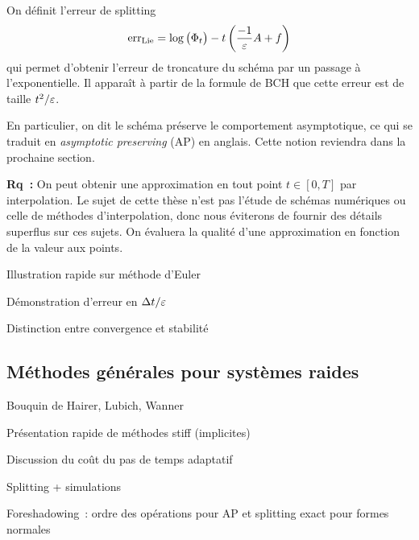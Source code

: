 On définit l'erreur de splitting 
\begin{equation*}
    \operatorname{err}_{\mathrm{Lie}} 
    = \log \big( \Phi_t \big) - t\left(\frac{-1}{\varepsilon}A + f\right) 
\end{equation*}
qui permet d'obtenir l'erreur de troncature du schéma par un passage à l'exponentielle. Il apparaît à partir de la formule de BCH que cette erreur est de taille $t^2/\varepsilon$. 



\bigskip\bigskip\bigskip
En particulier, on dit le schéma préserve le comportement asymptotique, 
ce qui se traduit en \textit{asymptotic preserving} (AP) en anglais.
Cette notion reviendra dans la prochaine section. 



\bigskip\bigskip\bigskip
\textbf{Rq~:} On peut obtenir une approximation en tout point $t \in
[0,T]$ par interpolation. Le sujet de cette thèse n'est pas l'étude de
schémas numériques ou celle de méthodes d'interpolation, donc nous 
éviterons de fournir des détails superflus sur ces sujets. On évaluera
la qualité d'une approximation en fonction de la valeur aux points. 

Illustration rapide sur méthode d'Euler

Démonstration d'erreur en $\Delta t/\varepsilon$

Distinction entre convergence et stabilité



\subsection*{Méthodes générales pour systèmes raides}

Bouquin de Hairer, Lubich, Wanner

Présentation rapide de méthodes stiff (implicites)

Discussion du coût du pas de temps adaptatif

Splitting + simulations

Foreshadowing~: ordre des opérations pour AP et splitting exact pour
formes normales